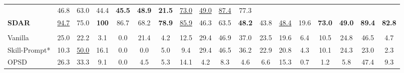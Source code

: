 \documentclass{llmxive}
\providecommand{\methodname}{\textsc{SDAR}\xspace}
\begin{document}
\begin{table}[t]
{\begin{tabular}{l CCCCCCC CCCCCCCC CC }
        & 46.8 & 63.0 & 44.4 & \textbf{45.5} & \textbf{48.9} & \textbf{21.5} & \underline{73.0} & \underline{49.0}
        & \underline{87.4} & 77.3
        \\
    \textbf{\methodname{}}
        & \underline{94.7} & 75.0 & \textbf{100} & 86.7 & 68.2 & \textbf{78.9} & \underline{85.9}
        & 46.3 & 63.5 & \textbf{48.2} & 43.8 & \underline{48.4} & 19.6 & \textbf{73.0} & \textbf{49.0}
        & \textbf{89.4} & \textbf{82.8}
        \\

    \midrule

      \\

    Vanilla
        & 25.0 & 22.2 & 3.1 & 0.0 & 21.4 & 4.2 & 12.5
        & 29.4 & 46.9 & 37.0 & 23.5 & 19.6 & 6.4 & 10.5 & 24.8
        & 46.5 & 4.7
        \\
    Skill-Prompt*
        & 10.3 & \underline{50.0} & 16.1 & 0.0 & 0.0 & 5.0 & 9.4
        & 29.4 & 46.5 & 36.2 & 22.9 & 20.8 & 4.3 & 10.1 & 24.3
        & 23.0 & 2.3
        \\
    OPSD
        & 26.3 & 33.3 & 9.1 & 0.0 & 4.5 & 5.3 & 14.1
        & 4.2 & 8.3 & 4.6 & 6.6 & 15.3 & 0.7 & 1.2 & 5.8
        & 47.4 & 9.3
        \\


\end{tabular}}
\end{table}
\end{document}
